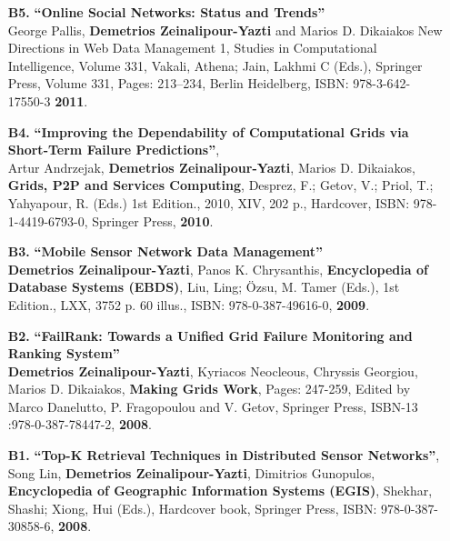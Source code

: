 \documentclass[10pt]{article}
\begin{document}
\begin{enumerate}
\item[{\bf B5.}] 
\label{B5}
{\bf ``Online Social Networks: Status and Trends''} \\
George Pallis, {\bf Demetrios Zeinalipour-Yazti} and Marios D. Dikaiakos
New Directions in Web Data Management 1, Studies in Computational Intelligence, 
Volume 331, Vakali, Athena; Jain, Lakhmi C (Eds.), Springer Press, Volume 331, Pages: 213--234,
Berlin Heidelberg, ISBN: 978-3-642-17550-3 {\bf 2011}.

\item[{\bf B4.}] 
\label{B4}
{\bf ``Improving the Dependability of Computational Grids via Short-Term Failure Predictions''}, \\
Artur Andrzejak, {\bf Demetrios Zeinalipour-Yazti}, Marios D. Dikaiakos,
{\bf Grids, P2P and Services Computing}, Desprez, F.; Getov, V.; Priol, T.; Yahyapour, R. (Eds.)
1st Edition., 2010, XIV, 202 p., Hardcover, ISBN: 978-1-4419-6793-0, Springer Press, {\bf 2010}.

\item[{\bf B3.}] 
\label{B3}
{\bf ``Mobile Sensor Network Data Management''} \\
{\bf Demetrios Zeinalipour-Yazti}, Panos K. Chrysanthis, 
{\bf Encyclopedia of Database Systems (EBDS)},
Liu, Ling; \"Ozsu, M. Tamer (Eds.), 1st Edition.,  LXX, 3752 p. 60 illus.,
ISBN: 978-0-387-49616-0, {\bf 2009}.

\item[{\bf B2.}] 
\label{B2}
{\bf ``FailRank: Towards a Unified Grid Failure Monitoring and Ranking System''} \\
{\bf Demetrios Zeinalipour-Yazti}, Kyriacos Neocleous, Chryssis Georgiou, Marios D. Dikaiakos, 
{\bf Making Grids Work}, Pages: 247-259, Edited by Marco Danelutto, P. Fragopoulou and V. Getov, 
Springer Press, ISBN-13 :978-0-387-78447-2, {\bf 2008}.

\item[{\bf B1.}] 
\label{B1}
{\bf ``Top-K Retrieval Techniques in Distributed Sensor Networks''},\\
Song Lin, {\bf Demetrios Zeinalipour-Yazti}, Dimitrios Gunopulos, 
{\bf Encyclopedia of Geographic Information Systems (EGIS)},
Shekhar, Shashi; Xiong, Hui (Eds.), Hardcover book, Springer Press, ISBN: 978-0-387-30858-6, {\bf 2008}.
\end{enumerate}
\end{document}
